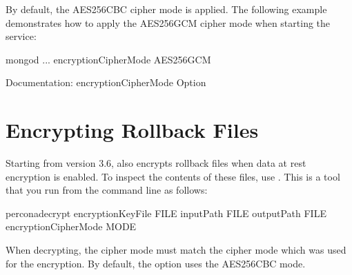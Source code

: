 \documentclass[letterpaper,10pt,english]{sphinxmanual}
\begin{document}
\sphinxAtStartPar
By default, the AES256\sphinxhyphen{}CBC cipher mode is applied. The following example
demonstrates how to apply the AES256\sphinxhyphen{}GCM cipher mode when starting the
 service:

\begin{sphinxVerbatim}[commandchars=\\\{\}]
\PYGZdl{} mongod ... \PYGZhy{}\PYGZhy{}encryptionCipherMode AES256\PYGZhy{}GCM
\end{sphinxVerbatim}


\nopagebreak

\begin{description}
\item[{ Documentation: encryptionCipherMode Option}] \leavevmode
\sphinxAtStartPar
{}

\end{description}




\section{Encrypting Rollback Files}
\label{\detokenize{data-at-rest-encryption:encrypting-rollback-files}}
\sphinxAtStartPar
Starting from version 3.6,  also encrypts rollback files when data at
rest encryption is enabled. To inspect the contents of these files, use
. This is a tool that you run from the command line as follows:

\begin{sphinxVerbatim}[commandchars=\\\{\}]
\PYGZdl{} perconadecrypt \PYGZhy{}\PYGZhy{}encryptionKeyFile FILE  \PYGZhy{}\PYGZhy{}inputPath FILE \PYGZhy{}\PYGZhy{}outputPath FILE \PYG{o}{[}\PYGZhy{}\PYGZhy{}encryptionCipherMode MODE\PYG{o}{]}
\end{sphinxVerbatim}

\sphinxAtStartPar
When decrypting, the cipher mode must match the cipher mode which was used for
the encryption. By default, the  option uses the
AES256\sphinxhyphen{}CBC mode.
\end{document}
